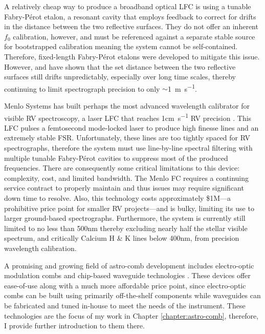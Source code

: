 A relatively cheap way to produce a broadband optical LFC is using a tunable Fabry-P\'erot etalon, a resonant cavity that employs feedback to correct for drifts in the distance between the two reflective surfaces. They do not offer an inherent $f_0$ calibration, however, and must be referenced against a separate stable source for bootstrapped calibration \citep{mccracken_single-lock_2014, sturmer_rubidium-traced_2017} meaning the system cannot be self-contained. Therefore, fixed-length Fabry-P\'erot etalons were developed to mitigate this issue. However, \citet{reiners_laser-lock_2014} and \citet{wildi_passive_2012} have shown that the set distance between the two reflective surfaces still drifts unpredictably, especially over long time scales, thereby continuing to limit spectrograph precision to only $\sim$\SI{1}{\meter\per\second}.

Menlo Systems has built perhaps the most advanced wavelength calibrator for visible RV spectroscopy, a laser LFC that reaches 1\si{\centi\meter\per\second} RV precision \citep{probst_laser_2014}. This LFC pulses a femtosecond mode-locked laser to produce high finesse lines and an extremely stable FSR. Unfortunately, these lines are too tightly spaced for RV spectrographs, therefore the system must use line-by-line spectral filtering with multiple tunable Fabry-P\'erot cavities to suppress most of the produced frequencies. There are consequently some critical limitations to this device: complexity, cost, and limited bandwidth. The Menlo FC requires a continuing service contract to properly maintain and thus issues may require significant down time to resolve. Also, this technology costs approximately \$1M---a prohibitive price point for smaller RV projects---and is bulky, limiting its use to larger ground-based spectrographs. Furthermore, the system is currently still limited to no less than 500\si{\nano\meter} thereby excluding nearly half the stellar visible spectrum, and critically Calcium H \& K lines below 400\si{\nano\meter}, from precision wavelength calibration.

A promising and growing field of astro-comb development includes electro-optic modulation combs and chip-based waveguide technologies \citep[e.g.][]{yi_demonstration_2016, carlson_ultrafast_2017, obrzud_broadband_2018, obrzud_visible_2019}. These devices offer ease-of-use along with a much more affordable price point, since electro-optic combs can be built using primarily off-the-shelf components while waveguides can be fabricated and tuned in-house to meet the needs of the instrument. These technologies are the focus of my work in Chapter \ref{chapter:astro-comb}, therefore, I provide further introduction to them there.

